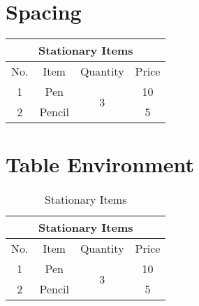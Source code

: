 \documentclass[12pt]{article}
\begin{document}
	\section{Spacing}
	
	\renewcommand{\arraystretch}{1.5}
	\begin{tabular}{|c|c|c|c|}
		\hline
		\multicolumn{4}{|c|}{Stationary Items} \\
		\hline
		No. & Item & Quantity & Price \\
		\hline
		1	& Pen & \multirow{2}{*}{3} & 10 \\
		\cline{1-2}\cline{4-4}
		2 & Pencil & & 5 \\
		\hline
	\end{tabular}
	
	\section{Table Environment}
	
	\lipsum[1-2]
	
	\begin{table}[h]
		
		\centering
		
			\renewcommand{\arraystretch}{1.5}
		\begin{tabular}{|c|c|c|c|}
			\hline
			\multicolumn{4}{|c|}{Stationary Items} \\
			\hline
			No. & Item & Quantity & Price \\
			\hline
			1	& Pen & \multirow{2}{*}{3} & 10 \\
			\cline{1-2}\cline{4-4}
			2 & Pencil & & 5 \\
			\hline
		\end{tabular}
		
		\caption{Stationary Items}
		
	\end{table}
	
\end{document}
